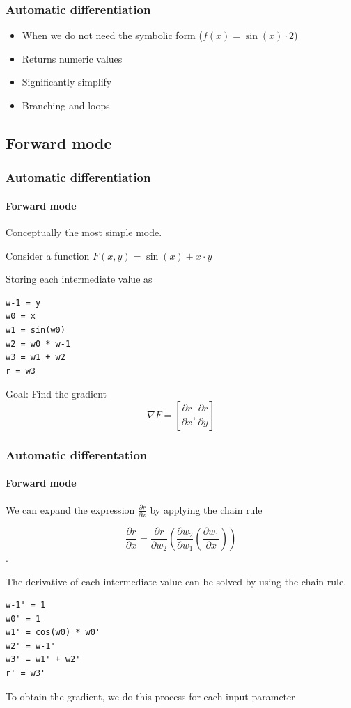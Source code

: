 \documentclass{beamer}
\begin{document}
\begin{frame}
    \frametitle{Automatic differentiation}
    
    \begin{itemize}
        \item When we do not need the symbolic form ($f(x) = \sin (x) \cdot 2$)
        \item Returns numeric values
        \item Significantly simplify
        \item Branching and loops
    \end{itemize}
\end{frame}

\subsection{Forward mode}

\begin{frame}[fragile]
    \frametitle{Automatic differentiation}
    \framesubtitle{Forward mode}
    
    Conceptually the most simple mode.
    \pause

    Consider a function $F(x, y) = \sin (x) + x \cdot y$
    \pause
    
    Storing each intermediate value as
    \begin{lstlisting}[label={lst:autodiff_fwd_trace}, caption={Forward trace of a simple function $f(x, y) = \sin(x) + x\cdot y$}]
w-1 = y
w0 = x
w1 = sin(w0)
w2 = w0 * w-1
w3 = w1 + w2
r = w3
    \end{lstlisting}
    Goal: Find the gradient
    $$\nabla F = \left[ \frac{\partial r}{\partial x}, \frac{\partial r}{\partial y} \right]$$
\end{frame}

\begin{frame}[fragile]
    \frametitle{Automatic differentation}
    \framesubtitle{Forward mode}
    
    We can expand the expression $\frac{\partial r}{\partial x}$ by applying the chain rule

    $$\frac{\partial r}{\partial x} = \frac{\partial r}{\partial w_2} \left(\frac{\partial w_2}{\partial w_1} \left(\frac{\partial w_1}{\partial x}\right) \right)$$.

    The derivative of each intermediate value can be solved by using the chain rule.

    \begin{lstlisting}[label={lst:autodiff_fwd_deriv}]
w-1' = 1
w0' = 1
w1' = cos(w0) * w0'
w2' = w-1'
w3' = w1' + w2'
r' = w3'
    \end{lstlisting}
    \pause
    To obtain the gradient, we do this process for each input parameter
\end{frame}
\end{document}
